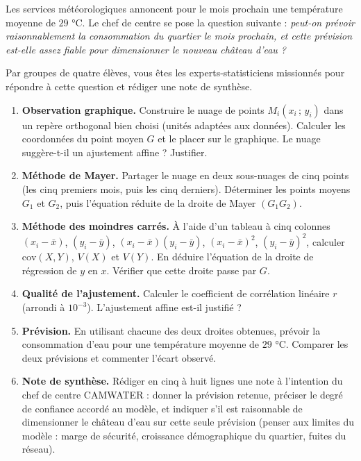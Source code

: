 \documentclass[11pt]{article}
\newcounter{popsec}
\newcounter{popsub}
\newcommand{\courssub}[1]{%
  \stepcounter{popsub}%
  \par\vspace{9pt}\noindent{\popxbold\fontsize{11.5}{13}\selectfont\color{popink}{\color{poporange}\thepopsec.\thepopsub}\hspace{6pt}#1}\par\nopagebreak\vspace{4pt}
}
\begin{document}
Les services météorologiques annoncent pour le mois prochain une température moyenne de $29$ °C. Le chef de centre se pose la question suivante : \emph{peut-on prévoir raisonnablement la consommation du quartier le mois prochain, et cette prévision est-elle assez fiable pour dimensionner le nouveau château d'eau ?}

Par groupes de quatre élèves, vous êtes les experts-statisticiens missionnés pour répondre à cette question et rédiger une note de synthèse.

\courssub{Consignes}

\begin{enumerate}
\item \textbf{Observation graphique.} Construire le nuage de points $M_i(x_i\,;\,y_i)$ dans un repère orthogonal bien choisi (unités adaptées aux données). Calculer les coordonnées du point moyen $G$ et le placer sur le graphique. Le nuage suggère-t-il un ajustement affine ? Justifier.
\item \textbf{Méthode de Mayer.} Partager le nuage en deux sous-nuages de cinq points (les cinq premiers mois, puis les cinq derniers). Déterminer les points moyens $G_1$ et $G_2$, puis l'équation réduite de la droite de Mayer $(G_1G_2)$.
\item \textbf{Méthode des moindres carrés.} À l'aide d'un tableau à cinq colonnes $(x_i-\bar{x})$, $(y_i-\bar{y})$, $(x_i-\bar{x})(y_i-\bar{y})$, $(x_i-\bar{x})^2$, $(y_i-\bar{y})^2$, calculer $\mathrm{cov}(X,Y)$, $V(X)$ et $V(Y)$. En déduire l'équation de la droite de régression de $y$ en $x$. Vérifier que cette droite passe par $G$.
\item \textbf{Qualité de l'ajustement.} Calculer le coefficient de corrélation linéaire $r$ (arrondi à $10^{-3}$). L'ajustement affine est-il justifié ?
\item \textbf{Prévision.} En utilisant chacune des deux droites obtenues, prévoir la consommation d'eau pour une température moyenne de $29$ °C. Comparer les deux prévisions et commenter l'écart observé.
\item \textbf{Note de synthèse.} Rédiger en cinq à huit lignes une note à l'intention du chef de centre CAMWATER : donner la prévision retenue, préciser le degré de confiance accordé au modèle, et indiquer s'il est raisonnable de dimensionner le château d'eau sur cette seule prévision (penser aux limites du modèle : marge de sécurité, croissance démographique du quartier, fuites du réseau).
\end{enumerate}
\end{document}

